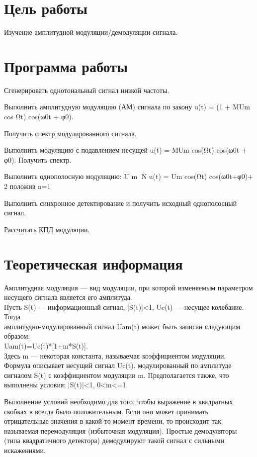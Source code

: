 







\section{Цель работы}
Изучение амплитудной модуляции/демодуляции сигнала.

\section{Программа работы}
Сгенерировать однотональный сигнал низкой частоты.

Выполнить амплитудную модуляцию (АМ) сигнала по закону u(t) = (1 + MUm cos Ωt) cos(ω0t + φ0). 

Получить спектр модулированного сигнала.

Выполнить модуляцию с подавлением несущей
u(t) = MUm cos(Ωt) cos(ω0t + φ0). Получить спектр.

Выполнить однополосную модуляцию:
U m 􏰀N
u(t) = Um cos(Ωt) cos(ω0t+φ0)+ 2 положив n=1

Выполнить синхронное детектирование и получить исходный однополосный сигнал.

Рассчитать КПД модуляции.\\


\section{Теоретическая информация}
Амплитудная модуляция — вид модуляции, при которой изменяемым параметром несущего сигнала является его амплитуда. \\ Пусть
S(t) — информационный сигнал, |S(t)|<1,
Uc(t) — несущее колебание.
Тогда \\амплитудно-модулированный сигнал Uam(t) может быть записан следующим образом:\\
Uam(t)=Uc(t)*[1+m*S(t)].\\
Здесь m — некоторая константа, называемая коэффициентом модуляции. Формула описывает несущий сигнал Uc(t), модулированный по амплитуде сигналом S(t) с коэффициентом модуляции m. Предполагается также, что выполнены условия:
|S(t)|<1, 0<m<=1.

Выполнение условий необходимо для того, чтобы выражение в квадратных скобках в всегда было положительным. Если оно может принимать отрицательные значения в какой-то момент времени, то происходит так называемая перемодуляция (избыточная модуляция). Простые демодуляторы (типа квадратичного детектора) демодулируют такой сигнал с сильными искажениями. 


